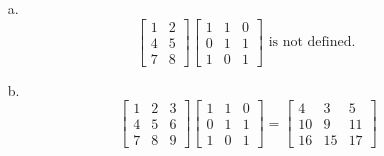 \documentclass[11pt]{article}
\begin{document}
\begin{enumerate}
\begin{enumerate}
              \item[a.]
                    \[
                        \begin{bmatrix}
                            1 & 2 \\
                            4 & 5 \\
                            7 & 8
                        \end{bmatrix}
                        \begin{bmatrix}
                            1 & 1 & 0 \\
                            0 & 1 & 1 \\
                            1 & 0 & 1
                        \end{bmatrix}
                        \text{ is not defined. }
                    \]

              \item[b.]
                    \[
                        \begin{bmatrix}
                            1 & 2 & 3 \\
                            4 & 5 & 6 \\
                            7 & 8 & 9
                        \end{bmatrix}
                        \begin{bmatrix}
                            1 & 1 & 0 \\
                            0 & 1 & 1 \\
                            1 & 0 & 1
                        \end{bmatrix}
                        =
                        \begin{bmatrix}
                            4  & 3  & 5  \\
                            10 & 9  & 11 \\
                            16 & 15 & 17
                        \end{bmatrix}
                    \]


\end{enumerate}
\end{enumerate}
\end{document}
